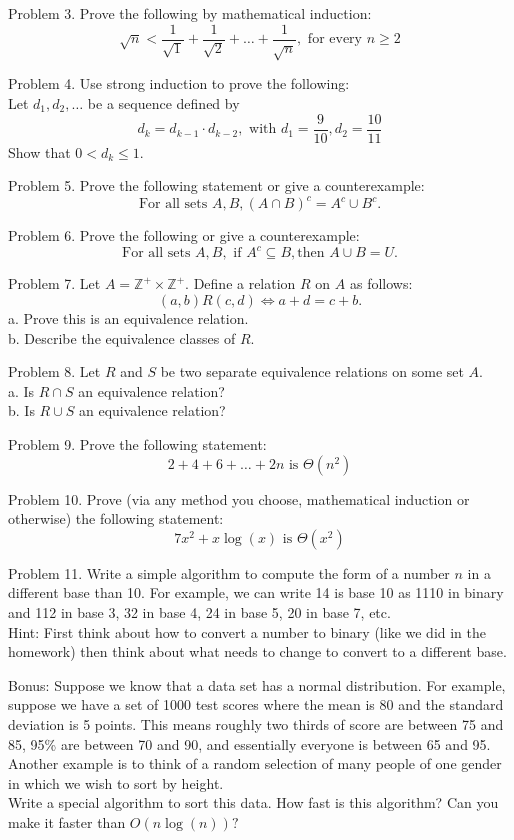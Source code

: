 \documentclass[16 pt]{amsart}
\theoremstyle{definition}
\theoremstyle{remark}
\numberwithin{equation}{subsection}
\newcommand{\Z}{\mathbb{Z}}
\begin{document}
\newpage
Problem 3. Prove the following by mathematical induction:
\[
\sqrt{n} < \frac{1}{\sqrt{1}} + \frac{1}{\sqrt{2}} + \dots + \frac{1}{\sqrt{n}}, \text{ for every } n\geq 2 
\]


\newpage
Problem 4. Use strong induction to prove the following:\\
Let $d_1,d_2,\dots$ be a sequence defined by
\[
d_k = d_{k-1}\cdot d_{k-2}, \text{ with } d_1 = \frac{9}{10}, d_2 = \frac{10}{11}
\]
Show that $0< d_k \leq 1$.


\newpage
Problem 5. Prove the following statement or give a counterexample:
\[
\text{For all sets } A,B, (A\cap B)^c = A^c \cup B^c.
\]


\newpage
Problem 6. Prove the following or give a counterexample:
\[
\text{For all sets } A,B, \text{ if } A^c \subseteq B, \text{then } A\cup B = U.
\]


\newpage
Problem 7. Let $A= \Z^+ \times \Z^+$.  Define a relation $R$ on $A$ as follows:
\[
(a,b) R (c,d) \iff a+d = c+b.
\]
a. Prove this is an equivalence relation.\\
b. Describe the equivalence classes of $R$.


\newpage
Problem 8. Let $R$ and $S$ be two separate equivalence relations on some set $A$.\\
a. Is $R\cap S$ an equivalence relation?\\
b. Is $R\cup S$ an equivalence relation?


\newpage
Problem 9. Prove the following statement:
\[
2+4+6+\dots + 2n \text{ is } \Theta(n^2)
\]


\newpage
Problem 10. Prove (via any method you choose, mathematical induction or otherwise) the following statement:
\[
7x^2 + x\log(x) \text{ is } \Theta(x^2)
\]


\newpage
Problem 11. Write a simple algorithm to compute the form of a number $n$ in a different base than 10.  For example, we can write 14 is base 10 as 1110 in binary and 112 in base 3, 32 in base 4, 24 in base 5, 20 in base 7, etc.\\

Hint: First think about how to convert a number to binary (like we did in the homework) then think about what needs to change to convert to a different base.


\newpage
Bonus: Suppose we know that a data set has a normal distribution.  For example, suppose we have a set of 1000 test scores where the mean is 80 and the standard deviation is 5 points.  This means roughly two thirds of score are between 75 and 85, 95\% are between 70 and 90, and essentially everyone is between 65 and 95. Another example is to think of a random selection of many people of one gender in which we wish to sort by height.\\

Write a special algorithm to sort this data.  How fast is this algorithm?  Can you make it faster than $O(n\log(n))?$
\end{document}
